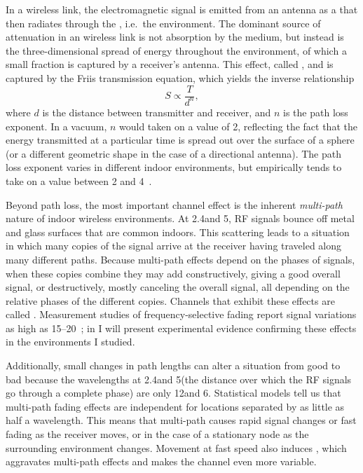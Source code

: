 In a wireless link, the electromagnetic signal is emitted from an antenna as a  that then radiates through the , i.e.\ the environment. The dominant source of attenuation in an wireless link is not absorption by the medium, but instead is the three-dimensional spread of energy throughout the environment, of which a small fraction is captured by a receiver's antenna. This effect, called , and is captured by the Friis transmission equation, which yields the inverse relationship
\begin{equation}
\label{eq:friis}
	S \propto \frac{T}{d^n},
\end{equation}
where $d$ is the distance between transmitter and receiver, and $n$ is the path loss exponent. In a vacuum, $n$ would taken on a value of 2, reflecting the fact that the energy transmitted at a particular time is spread out over the surface of a sphere (or a different geometric shape in the case of a directional antenna). The path loss exponent varies in different indoor environments, but empirically tends to take on a value between 2 and 4~\cite{Sklar}.

Beyond path loss, the most important channel effect is the inherent \emph{multi-path} nature of indoor wireless environments. At 2.4\GHz and 5\GHz, RF signals bounce off metal and glass surfaces that are common indoors. This scattering leads to a situation in which many copies of the signal arrive at the receiver having traveled along many different paths. Because multi-path effects depend on the phases of signals, when these copies combine they may add constructively, giving a good overall signal, or destructively, mostly canceling the overall signal, all depending on the relative phases of the different copies. Channels that exhibit these effects are called . Measurement studies of frequency-selective fading report signal variations as high as 15--20\dB~\cite{Judd_CHARM}; in  I will present experimental evidence confirming these effects in the environments I studied.

Additionally, small changes in path lengths can alter a situation from good to bad because the wavelengths at 2.4\GHz and 5\GHz (the distance over which the RF signals go through a complete phase) are only 12\cm and 6\cm. Statistical models tell us that multi-path fading effects are independent for locations separated by as little as half a wavelength. This means that multi-path causes rapid signal changes or fast fading as the receiver moves, or in the case of a stationary node as the surrounding environment changes.  Movement at fast speed also induces , which aggravates multi-path effects and makes the channel even more variable.

